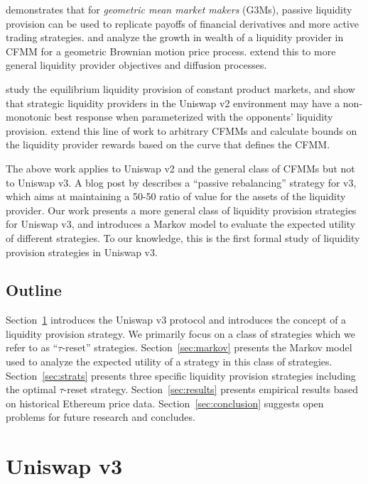 \documentclass[sigconf, usenames, dvipsnames]{acmart}
\begin{document}
\citet{evans2020liquidity} demonstrates that for {\em  geometric mean market makers} (G3Ms), passive liquidity provision can be used to replicate payoffs of financial derivatives and more active trading strategies. \citet{tassy2020growth} and \citet{uniswapsfinancialalchemy} analyze the growth in wealth of a liquidity provider in CFMM for a geometric Brownian motion price process. \citet{evans2021optimal} extend this to more general liquidity provider objectives and diffusion processes.

\citet{aoyagi2020lazy} study the equilibrium liquidity provision of constant product markets, and show that strategic liquidity providers in the Uniswap v2 environment may have a non-monotonic best response when parameterized with the opponents' liquidity provision. \citet{angeris2020does} extend this line of work to arbitrary CFMMs and calculate bounds on the liquidity provider rewards based on the curve that defines the CFMM.

The above work applies to Uniswap v2 and the general class of CFMMs but not to Uniswap v3. A blog post by \citet{charmalphavault} describes a ``passive rebalancing'' strategy for v3, which aims at maintaining a 50-50 ratio of value for the assets of the liquidity provider. Our work presents a more general class of liquidity provision strategies for Uniswap v3, and introduces a Markov model to evaluate the expected utility of different strategies. To our knowledge, this is the first formal study of  liquidity provision strategies in Uniswap v3.


\subsection{Outline}
Section~\ref{sec:uniswap} introduces the Uniswap v3 protocol and introduces the concept of a liquidity provision strategy. We primarily focus on a class of strategies which we refer to as ``$\tau$-reset'' strategies. Section~\ref{sec:markov} presents the Markov model used to analyze the expected utility of a strategy in this class of strategies. Section~\ref{sec:strats} presents three specific liquidity provision strategies including the optimal $\tau$-reset strategy. Section~\ref{sec:results} presents empirical results based on historical Ethereum price data. Section~\ref{sec:conclusion} suggests open problems for future research and concludes. 

\section{Uniswap v3}
\label{sec:uniswap}
\end{document}
